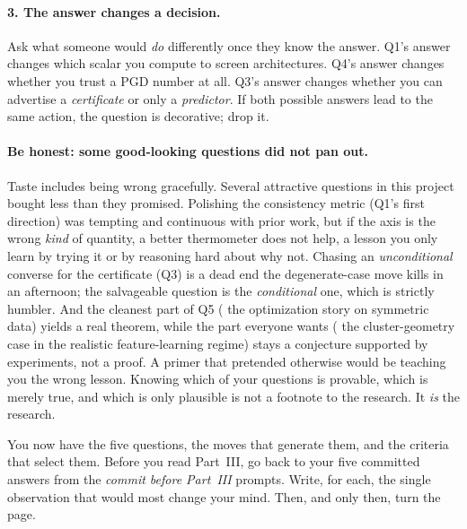 \paragraph{3. The answer changes a decision.} Ask what someone would \emph{do} differently once they
know the answer. Q1's answer changes which scalar you compute to screen architectures. Q4's answer
changes whether you trust a PGD number at all. Q3's answer changes whether you can advertise a
\emph{certificate} or only a \emph{predictor}. If both possible answers lead to the same action, the
question is decorative; drop it.

\paragraph{Be honest: some good-looking questions did not pan out.} Taste includes being wrong
gracefully. Several attractive questions in this project bought less than they promised. Polishing the
consistency metric (Q1's first direction) was tempting and continuous with prior work, but if the
axis is the wrong \emph{kind} of quantity, a better thermometer does not help, a lesson you only
learn by trying it or by reasoning hard about why not. Chasing an \emph{unconditional} converse for
the certificate (Q3) is a dead end the degenerate-case move kills in an afternoon; the salvageable
question is the \emph{conditional} one, which is strictly humbler. And the cleanest part of Q5 (
the optimization story on symmetric data) yields a real theorem, while the part everyone wants (
the cluster-geometry case in the realistic feature-learning regime) stays a conjecture supported
by experiments, not a proof. A primer that pretended otherwise would be teaching you the wrong
lesson. Knowing which of your questions is provable, which is merely true, and which is only plausible
is not a footnote to the research. It \emph{is} the research.

\medskip

You now have the five questions, the moves that generate them, and the criteria that select them.
Before you read Part~III, go back to your five committed answers from the \textit{commit before
Part~III} prompts. Write, for each, the single observation that would most change your mind. Then,
and only then, turn the page.

